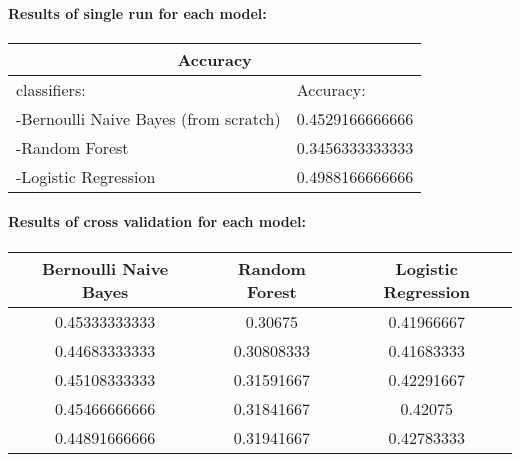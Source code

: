 \documentclass[12pt]{report}
\begin{document}
	\paragraph{}
	\paragraph{Results of single run for each model:}
	\paragraph{}
	
	\begin{center}
		\begin{tabular}{ |p{3cm}||p{3cm}| }
			\hline
			\multicolumn{2}{|c|}{Accuracy} \\
			\hline
			classifiers:& Accuracy:\\
			\hline
			-Bernoulli Naive Bayes (from scratch)   & 0.4529166666666\\
			-Random Forest&   0.3456333333333\\
			-Logistic Regression &0.4988166666666\\
			\hline
		\end{tabular}
	\end{center}
	\paragraph{}
	\paragraph{Results of cross validation for each model:}
	\paragraph{}
	\begin{center}
		\begin{tabular}{||c c c||} 
			\hline
			Bernoulli Naive Bayes & Random Forest & Logistic Regression\\ [0.5ex] 
			\hline\hline
			0.45333333333 & 0.30675 & 0.41966667\\ 
			\hline
			0.44683333333 & 0.30808333 & 0.41683333\\
			\hline
			0.45108333333 & 0.31591667 & 0.42291667\\
			\hline
			0.45466666666 & 0.31841667& 0.42075   \\
			\hline
			0.44891666666 & 0.31941667 & 0.42783333\\ [1ex] 
			\hline
		\end{tabular}
	\end{center}
		
\end{document}
